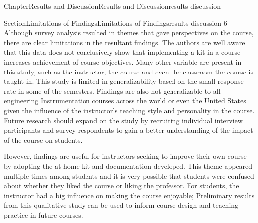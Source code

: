 \documentclass[oneside,10pt,]{book}
\numberwithin{equation}{section}
\begin{document}
\begin{chapterptx}{Chapter}{Results and Discussion}{}{Results and Discussion}{}{}{results-discussion}
\begin{sectionptx}{Section}{Limitations of Findings}{}{Limitations of Findings}{}{}{results-discussion-6}
Although survey analysis resulted in themes that gave perspectives on the course, there are clear limitations in the resultant findings. The authors are well aware that this data does not conclusively show that implementing a kit in a course increases achievement of course objectives. Many other variable are present in this study, such as the instructor, the course and even the classroom the course is taught in. This study is limited in generalizability based on the small response rate in some of the semesters. Findings are also not generalizable to all engineering Instrumentation courses across the world or even the United States given the influence of the instructor's teaching style and personality in the course. Future research should expand on the study by recruiting individual interview participants and survey respondents to gain a better understanding of the impact of the course on students.%
\par
However, findings are useful for instructors seeking to improve their own course by adopting the at-home kit and documentation developed. This theme appeared multiple times among students and it is very possible that students were confused about whether they liked the course or liking the professor. For students, the instructor had a big influence on making the course enjoyable; Preliminary results from this qualitative study can be used to inform course design and teaching practice in future courses.%
\end{sectionptx}
\end{chapterptx}
%
%
\typeout{************************************************}
\typeout{************************************************}
%
\end{document}
